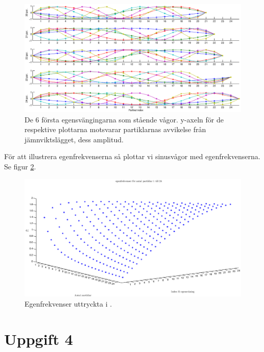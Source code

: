 \documentclass[12pt,a4paper]{article}
\newcommand{\captiona}[1]{\caption{\scriptsize{#1}}}
\begin{document}
		\begin{figure}[h]
			\includegraphics[width=1\textwidth]{staendevagor.eps}
			\vspace{-36pt}
			\captiona{De 6 första egensvängingarna som stående vågor. y-axeln
			för de respektive plottarna motsvarar partiklarnas avvikelse från jämnviktslägget,
			dess amplitud.}
			\label{stavag}
		\end{figure}
		
		För att illustrera egenfrekvenserna så plottar vi sinusvågor med egenfrekvenserna. Se figur \ref{egenf}.
		
		
		\begin{figure}[h]
			\includegraphics[width=1\textwidth]{egenfrekvenser.eps}
			\vspace{-28pt}
			\captiona{Egenfrekvenser uttryckta i .}
			\label{egenf}
		\end{figure}
		
\section{Uppgift 4}
	
\end{document}
